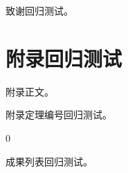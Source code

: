 \documentclass[tocdepth3]{uestcthesis}
\begin{document}
\uestcacknowledgements
致谢回归测试。

\uestcprintbibliography

\uestcappendix
\chapter{附录回归测试}
附录正文。
\begin{theorem}附录定理编号回归测试。\end{theorem}
\begin{algorithm}[htbp]
    \caption{附录算法编号回归测试}
    \begin{algorithmic}
        \State \Return $0$
    \end{algorithmic}
\end{algorithm}

\uestcachievements
成果列表回归测试。
\end{document}
